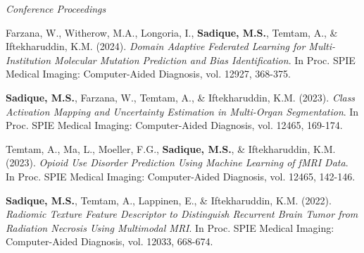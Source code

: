 \documentclass[11pt,letterpaper]{article}
\begin{document}
\vspace{7pt}
\textit{Conference Proceedings}
\begin{enumerate}[label={[C\arabic*]},leftmargin=34pt]
\item Farzana, W., Witherow, M.A., Longoria, I., \textbf{Sadique, M.S.}, Temtam, A., \& Iftekharuddin, K.M. (2024). \textit{Domain Adaptive Federated Learning for Multi-Institution Molecular Mutation Prediction and Bias Identification}. In Proc. SPIE Medical Imaging: Computer-Aided Diagnosis, vol. 12927, 368-375.
\item \textbf{Sadique, M.S.}, Farzana, W., Temtam, A., \& Iftekharuddin, K.M. (2023). \textit{Class Activation Mapping and Uncertainty Estimation in Multi-Organ Segmentation}. In Proc. SPIE Medical Imaging: Computer-Aided Diagnosis, vol. 12465, 169-174.
\item Temtam, A., Ma, L., Moeller, F.G., \textbf{Sadique, M.S.}, \& Iftekharuddin, K.M. (2023). \textit{Opioid Use Disorder Prediction Using Machine Learning of fMRI Data}. In Proc. SPIE Medical Imaging: Computer-Aided Diagnosis, vol. 12465, 142-146.
\item \textbf{Sadique, M.S.}, Temtam, A., Lappinen, E., \& Iftekharuddin, K.M. (2022). \textit{Radiomic Texture Feature Descriptor to Distinguish Recurrent Brain Tumor from Radiation Necrosis Using Multimodal MRI}. In Proc. SPIE Medical Imaging: Computer-Aided Diagnosis, vol. 12033, 668-674.
\end{enumerate}
\end{document}
